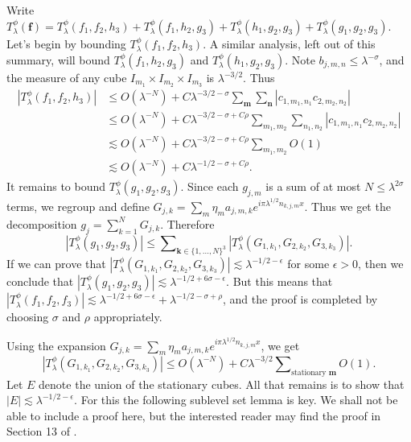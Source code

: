 \documentclass[12pt]{amsart}
\begin{document}
Write $T^\phi_\lambda( \boldsymbol{f}) = T^\phi_\lambda(f_1,f_2,h_3) + T^\phi_\lambda(f_1,h_2,g_3) + T^\phi_\lambda(h_1,g_2,g_3) + T^\phi_\lambda(g_1,g_2,g_3)$. Let's begin by bounding $T_\lambda^\phi(f_1,f_2,h_3)$. A similar analysis, left out of this summary, will bound $T^\phi_\lambda(f_1,h_2,g_3)$ and $T^\phi_\lambda(h_1,g_2,g_3)$. Note $b_{j,m,n}\leq \lambda^{-\sigma}$, and the measure of any cube $I_{m_1}\times I_{m_2}\times I_{m_3}$ is $\lambda^{-3/2}$. Thus
%
\begin{align*}
    |T_\lambda^\phi(f_1,f_2,h_3)| &\leq O(\lambda^{-N}) + C \lambda^{-3/2-\sigma}\sum\nolimits_{\boldsymbol{m}}\sum\nolimits_{\boldsymbol{n}} |c_{1,m_1,n_1}c_{2,m_2,n_2}|\\
    &\leq O(\lambda^{-N}) + C \lambda^{-3/2-\sigma+C\rho}\sum\nolimits_{m_1,m_2}\sum\nolimits_{n_1,n_2} |c_{1,m_1,n_1}c_{2,m_2,n_2}|\\
    &\lesssim O(\lambda^{-N}) + C \lambda^{-3/2-\sigma+C\rho}\sum\nolimits_{m_1,m_2}O(1)\\
    &\lesssim O(\lambda^{-N}) + C \lambda^{-1/2-\sigma+C\rho}.
\end{align*}
%
It remains to bound $T^\phi_\lambda(g_1,g_2,g_3)$. Since each $g_{j,m}$ is a sum of at most $N\leq \lambda^{2\sigma}$ terms, we regroup and define $G_{j,k}=\sum_m \eta_m a_{j,m,k} e^{i\pi \lambda^{1/2}n_{k,j,m}x}$. Thus we get the decomposition $g_j=\sum_{k=1}^N G_{j,k}$. Therefore
\begin{equation}
    |T_\lambda^\phi (g_1,g_2,g_3)|\leq \sum\nolimits_{\boldsymbol{k}\in\{1,\ldots,N\}^3 } |T_\lambda^\phi (G_{1,k_1},G_{2,k_2},G_{3,k_3})|.
\end{equation}
If we can prove that $|T_\lambda^\phi (G_{1,k_1},G_{2,k_2},G_{3,k_3})|\lesssim \lambda^{-1/2-\epsilon}$ for some $\epsilon > 0$, then we conclude that $|T_\lambda^\phi (g_1,g_2,g_3)|\lesssim \lambda^{-1/2+6\sigma-\epsilon}$. But this means that $|T^\phi_\lambda(f_1,f_2,f_3)| \lesssim \lambda^{-1/2+6\sigma-\epsilon} + \lambda^{-1/2-\sigma+\rho}$, and the proof is completed by choosing $\sigma$ and $\rho$ appropriately.

Using the expansion $G_{j,k}=\sum_m \eta_m a_{j,m,k} e^{i\pi \lambda^{1/2}n_{k,j,m}x}$, we get
\begin{equation}
    |T_\lambda^\phi (G_{1,k_1},G_{2,k_2},G_{3,k_3})|\leq O(\lambda^{-N}) +C\lambda^{-3/2}\sum\nolimits_{\text{stationary }\boldsymbol{m}} O(1).
\end{equation}
Let $E$ denote the union of the stationary cubes. All that remains is to show that $|E|\lesssim \lambda^{-1/2-\epsilon}$. For this the following sublevel set lemma is key. We shall not be able to include a proof here, but the interested reader may find the proof in Section 13 of \cite{ChristTopicPaperjdmrc}.
\end{document}
